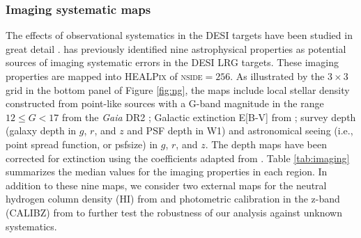 \subsubsection{Imaging systematic maps}
The effects of observational systematics in the DESI targets have been studied in great detail \cite[see, e.g.,][]{kitanidis2020imaging, zhou2021clustering, chaussidon2022angular}.  \cite{zhou2022target} has previously identified nine astrophysical properties as potential sources of imaging systematic errors in the DESI LRG targets. These imaging properties are mapped into \textsc{HEALPix} of \textsc{nside}$=256$. As illustrated by the $3\times3$ grid in the bottom panel of Figure \ref{fig:ng}, the maps include local stellar density constructed from point-like sources with a G-band magnitude in the range $12 \leq G < 17$ from the \textit{Gaia} DR2 \citep[see,][]{gaiadr2, myers2022}; Galactic extinction E[B-V] from \cite{schlegel1998maps}; survey depth (galaxy depth in $g$, $r$, and $z$ and PSF depth in W1) and astronomical seeing (i.e., point spread function, or psfsize) in $g$, $r$, and $z$. The depth maps have been corrected for extinction using the coefficients adapted from \cite{2011ApJ...737..103S}. Table \ref{tab:imaging} summarizes the median values for the imaging properties in each region. In addition to these nine maps, we consider two external maps for the neutral hydrogen column density (HI) from \cite{2016A&A...594A.116H} and photometric calibration in the z-band (CALIBZ) from \cite{desi2023sv} to further test the robustness of our analysis against unknown systematics.

